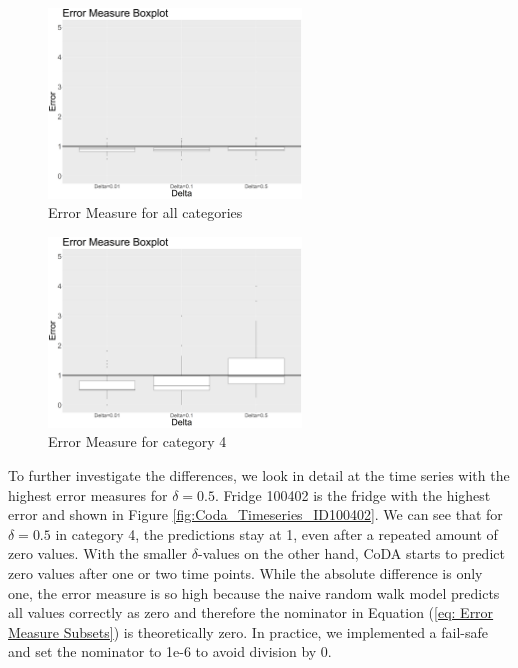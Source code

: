 \begin{figure}[htbp]
	\centering
		\includegraphics[width=0.6\textwidth]{Graphiken/ErrorMeasureCoDA_Box_all__Variation_dL.png}
	\caption{Error Measure for all categories}
	\label{fig:ErrorMeasureCoDA_Box_all__Variation_dL}
\end{figure}

\begin{figure}[htbp]
	\centering
		\includegraphics[width=0.6\textwidth]{Graphiken/ErrorMeasureCoDA_Box_all__Variation_dLcat4.png}
	\caption{Error Measure for category 4}
	\label{fig:ErrorMeasureCoDA_Box_all__Variation_dLcat4}
\end{figure}



To further investigate the differences, we look in detail at the time series with the highest error measures for $\delta=0.5$. Fridge 100402 is the fridge with the highest error and shown in Figure \ref{fig:Coda_Timeseries_ID100402}. We can see that for $\delta=0.5$ in category 4, the predictions stay at 1, even after a repeated amount of zero values. With the smaller $\delta$-values on the other hand, CoDA starts to predict zero values after one or two time points. While the absolute difference is only one, the error measure is so high because the naive random walk model predicts all values correctly as zero and therefore the nominator in Equation (\ref{eq: Error Measure Subsets}) is theoretically zero. In practice, we implemented a fail-safe and set the nominator to 1e-6 to avoid division by 0. 


